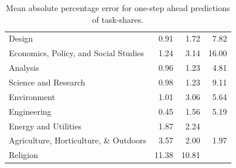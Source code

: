 \documentclass[letterpaper]{article} %
\begin{document}
\begin{table}[h!]
\begin{tabular}{l || r | r | r}
                                      Design &      0.91 &     1.72 &     7.82 \\
       Economics, Policy, and Social Studies &      1.24 &     3.14 &    16.00 \\
                                    Analysis &      0.96 &     1.23 &     4.81 \\
                        Science and Research &      0.98 &     1.23 &     9.11 \\
                                 Environment &      1.01 &     3.06 &     5.64 \\
                                 Engineering &      0.45 &     1.56 &     5.19 \\
                        Energy and Utilities &      1.87 &     2.24 &      \\
 Agriculture, Horticulture, \& Outdoors &      3.57 &     2.00 &     1.97 \\
                                    Religion &     11.38 &    10.81 &      \\
\hline
\end{tabular}
\caption{ Mean absolute percentage error for one-step ahead predictions of task-shares. 
\label{table:TS_HML_pred} }
\end{table}
\end{document}
